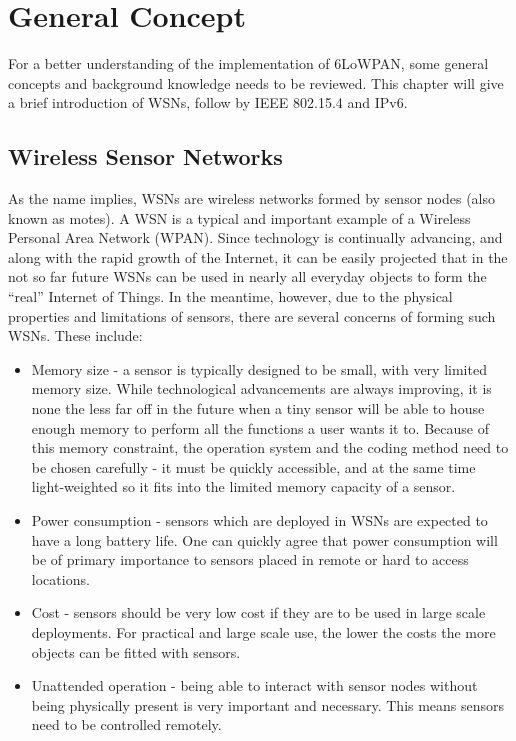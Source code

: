\chapter{General Concept}
\label{General:2.0}
For a better understanding of the implementation of 6LoWPAN, some general concepts and background knowledge needs to be reviewed. This chapter will give a brief introduction of WSNs, follow by IEEE 802.15.4 and IPv6.

\section{Wireless Sensor Networks}
\label{General:WSN}

As the name implies, WSNs are wireless networks formed by sensor
nodes (also known as motes)\@. A WSN is a typical and important example of a Wireless Personal
Area Network (WPAN)\@. Since technology is continually advancing, and along with the rapid growth of the Internet, it can be easily projected that in the not so far future WSNs can be used in nearly all everyday objects to form the ``real'' Internet of Things. In the meantime, however, due to the physical properties and limitations of sensors, there are several concerns of forming such WSNs. These include:

\begin{itemize}
\item Memory size - a sensor is typically designed to be small, with very limited memory
size. While technological advancements are always improving, it is none the less far off in the future when a tiny sensor will be able to house enough memory to perform all the functions a user wants it to. Because of this memory constraint, the operation system and the coding method need to be chosen carefully - it must be quickly accessible, and at the same time light-weighted so it fits into the limited memory capacity of a sensor.

\item Power consumption - sensors which are deployed in WSNs are expected to have a long battery life.  One can quickly agree that power consumption will be of primary importance to sensors placed in remote or hard to access locations.

\item Cost - sensors should be very low cost if they are to be used in large scale deployments.  For practical and large scale use, the lower the costs the more objects can be fitted with sensors.

\item  Unattended operation - being able to interact with sensor nodes without being physically
present is very important and necessary.  This means sensors need to be controlled remotely. 
\end{itemize}

